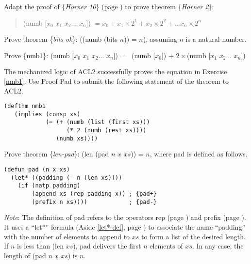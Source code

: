 \begin{ExerciseList}

\Exercise
\label{horner2-thm}
Adapt the proof of \{\emph{Horner 10}\} (page \pageref{horner10-thm})
to prove
theorem \{\emph{Horner 2}\}:
\begin{quote}
(numb [$x_0$ $x_1$ $x_2 \dots$ $x_{n}$])
$= x_0 + x_1 \times 2^1 + x_2 \times 2^2 + \dots x_{n} \times 2^{n}$
\end{quote}

\Exercise \label{bits-ok}
Prove theorem \{\emph{bits ok}\}: ((numb (bits $n$)) = $n$), assuming $n$ is a natural number.

\Exercise \label{nmb1}
Prove \{nmb1\}: (numb [$x_0$ $x_1$ $x_2 \dots$ $x_{n}$]) $=$ (numb [$x_0$]) $+$ $2\times$(numb [$x_1$ $x_2 \dots$ $x_{n}$])

\Exercise \label{nmb1-acl2}
The mechanized logic of ACL2 successfully proves the equation in Exercise \ref{nmb1}.
Use Proof Pad to submit the following statement of the theorem to ACL2.
\begin{Verbatim}
(defthm nmb1
   (implies (consp xs)
            (= (+ (numb (list (first xs)))
                  (* 2 (numb (rest xs))))
               (numb xs))))
\end{Verbatim}

\Exercise Prove theorem \{\emph{len-pad}\}: (len (pad $n$ $x$ $xs$)) = $n$,
where pad is defined as follows.\\
\begin{samepage}
\label{pad-defun}
\begin{Verbatim}
(defun pad (n x xs)
  (let* ((padding (- n (len xs))))
    (if (natp padding)
        (append xs (rep padding x)) ; {pad+}
        (prefix n xs))))            ; {pad-}
\end{Verbatim}
\end{samepage}
\emph{Note}: The definition of pad refers to the operators
rep (page \pageref{rep-equations}) and prefix (page \pageref{prefix-equations}).
It uses a ``let$*$'' formula (Aside \ref{let*-def}, page \pageref{let*-def})
to associate the name ``padding'' with the number of elements to append to $xs$
to form a list of the desired length. If $n$ is less than (len $xs$),
pad delivers the first $n$ elements of $xs$. In any case, the length of
(pad $n$ $x$ $xs$) is $n$.


\end{ExerciseList}
